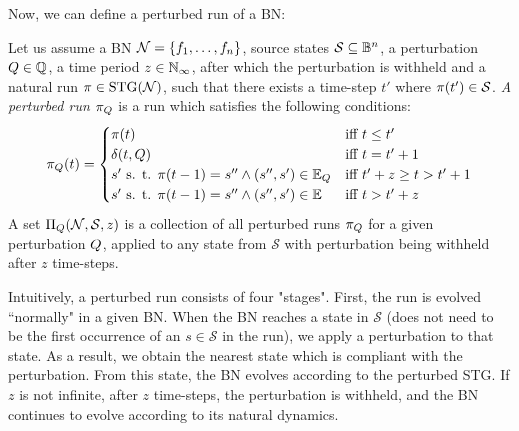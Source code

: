 Now, we can define a perturbed run of a BN:

\begin{definition}
    \label{def:perturbed_run}
    Let us assume a BN $\mathcal{N} = \{f_1, \ldots, f_n\}$, source states $\mathcal{S} \subseteq \mathbb{B}^n$, a perturbation $Q \in \mathbb{Q}$, a time period $z \in \mathbb{N}_{\infty}$, after which the perturbation is withheld and a natural run $\pi \in \text{\upshape STG}(\mathcal{N})$, such that there exists a time-step $t'$ where $\pi(t') \in \mathcal{S}$. \emph{A perturbed run $\pi_{Q}$} is a run which satisfies the following conditions:
    $$
    \pi_{Q}(t) = \begin{cases}
        \pi(t) & \text{iff } t \leq t' \\
        \delta(t, Q) & \text{iff } t = t' + 1 \\
        s'  \text{ s. t. } \pi(t-1) = s'' \land (s'', s') \in \mathbb{E}_{Q} & \text{iff }  t'+z \geq t > t' + 1 \\
        s'  \text{ s. t. } \pi(t-1) = s'' \land (s'', s') \in \mathbb{E} & \text{iff } t > t'+z
    \end{cases}
    $$
    A set $\Pi_{Q}(\mathcal{N}, \mathcal{S}, z)$ is a collection of all perturbed runs $\pi_{Q}$ for a given perturbation $Q$, applied to any state from $\mathcal{S}$ with perturbation being withheld after $z$ time-steps.
\end{definition}

 Intuitively, a perturbed run consists of four "stages". First, the run is evolved ``normally" in a given BN. When the BN reaches a state in $\mathcal{S}$ (does not need to be the first occurrence of an $s \in \mathcal{S}$ in the run), we apply a perturbation to that state. As a result, we obtain the nearest state which is compliant with the perturbation. From this state, the BN evolves according to the perturbed STG. If $z$ is not infinite, after $z$ time-steps, the perturbation is withheld, and the BN continues to evolve according to its natural dynamics. 

